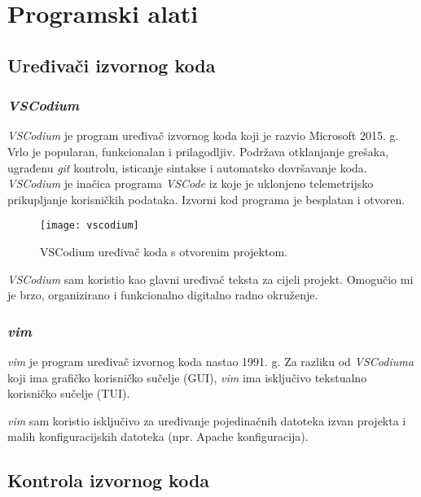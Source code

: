 \section{Programski alati}

  \subsection{Uređivači izvornog koda}

    \subsubsection*{\textit{VSCodium}}

      \textit{VSCodium} je program uređivač izvornog koda koji je razvio
      Microsoft 2015. g. Vrlo je popularan, funkcionalan i prilagodljiv.
      Podržava otklanjanje grešaka, ugrađenu \textit{git} kontrolu, isticanje
      sintakse i automatsko dovršavanje koda. \textit{VSCodium} je inačica
      programa \textit{VSCode} iz koje je uklonjeno telemetrijsko prikupljanje
      korisničkih podataka. Izvorni kod programa je besplatan i otvoren.

      \begin{figure}[h]
        \texttt{[image: vscodium]}
        \caption{VSCodium uređivač koda s otvorenim projektom.}
      \end{figure}

      \textit{VSCodium} sam koristio kao glavni uređivač teksta za cijeli
      projekt. Omogučio mi je brzo, organizirano i funkcionalno digitalno radno
      okruženje.

      \subsubsection*{\textit{vim}}

      \textit{vim} je program uređivač izvornog koda nastao 1991. g. Za razliku
      od \textit{VSCodiuma} koji ima grafičko korisničko sučelje (GUI),
      \textit{vim} ima isključivo tekstualno korisničko sučelje (TUI).

      \textit{vim} sam koristio isključivo za uređivanje pojedinačnih datoteka
      izvan projekta i malih konfiguracijskih datoteka (npr. Apache
      konfiguracija).

  \subsection{Kontrola izvornog koda}

